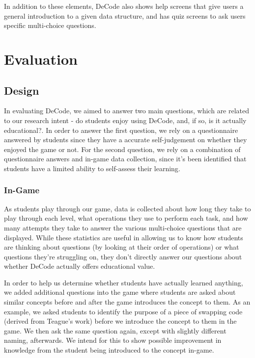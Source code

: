 \documentclass[11pt]{article}
\begin{document}
In addition to these elements, DeCode also shows help screens that give users a general introduction to a given data structure, and has quiz screens to ask users specific multi-choice questions.
\section{Evaluation}
\subsection{Design}
In evaluating DeCode, we aimed to answer two main questions, which are related to our research intent - do students enjoy using DeCode, and, if so, is it actually educational?. In order to answer the first question, we rely on a questionnaire answered by students since they have a accurate self-judgement on whether they enjoyed the game or not. For the second question, we rely on a combination of questionnaire answers and in-game data collection, since it's been identified that students have a limited ability to self-assess their learning\cite{Battistella}.
\subsubsection{In-Game}
As students play through our game, data is collected about how long they take to play through each level, what operations they use to perform each task, and how many attempts they take to answer the various multi-choice questions that are displayed. While these statistics are useful in allowing us to know how students are thinking about questions (by looking at their order of operations) or what questions they're struggling on, they don't directly answer our questions about whether DeCode actually offers educational value.\par
In order to help us determine whether students have actually learned anything, we added additional questions into the game where students are asked about similar concepts before and after the game introduces the concept to them. As an example, we asked students to identify the purpose of a piece of swapping code (derived from Teague's work\cite{Teague:2012:SHW:2483716.2483727}) before we introduce the concept to them in the game. We then ask the same question again, except with slightly different naming, afterwards. We intend for this to show possible improvement in knowledge from the student being introduced to the concept in-game.
\end{document}
